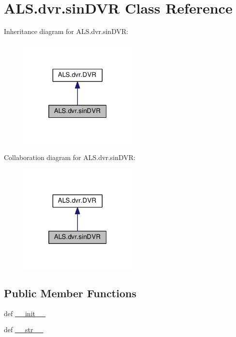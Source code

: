 \hypertarget{class_a_l_s_1_1dvr_1_1sin_d_v_r}{\section{A\+L\+S.\+dvr.\+sin\+D\+V\+R Class Reference}
\label{class_a_l_s_1_1dvr_1_1sin_d_v_r}
}


Inheritance diagram for A\+L\+S.\+dvr.\+sin\+D\+V\+R\+:
\nopagebreak
\begin{figure}[H]
\begin{center}
\leavevmode
\includegraphics[width=169pt]{class_a_l_s_1_1dvr_1_1sin_d_v_r__inherit__graph}
\end{center}
\end{figure}


Collaboration diagram for A\+L\+S.\+dvr.\+sin\+D\+V\+R\+:
\nopagebreak
\begin{figure}[H]
\begin{center}
\leavevmode
\includegraphics[width=169pt]{class_a_l_s_1_1dvr_1_1sin_d_v_r__coll__graph}
\end{center}
\end{figure}
\subsection*{Public Member Functions}
\begin{DoxyCompactItemize}
\item 
def \hyperlink{class_a_l_s_1_1dvr_1_1sin_d_v_r_af7bf7e2c39b487fa4f1760291ba3c75a}{\+\_\+\+\_\+init\+\_\+\+\_\+}
\item 
def \hyperlink{class_a_l_s_1_1dvr_1_1sin_d_v_r_aef42f1f26adbe2379904be21bc1f4d33}{\+\_\+\+\_\+str\+\_\+\+\_\+}
\end{DoxyCompactItemize}
